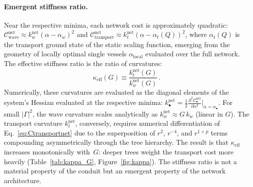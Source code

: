 \documentclass[11pt,a4paper]{article}
\theoremstyle{remark}
\begin{document}
\paragraph{Emergent stiffness ratio.}
Near the respective minima, each network cost is approximately quadratic:
$\mathcal{C}_\mathrm{wave}^\mathrm{net} \approx k_w^\mathrm{net}(\alpha -
\alpha_w)^2$ and
$\mathcal{C}_\mathrm{transport}^\mathrm{net} \approx k_t^\mathrm{net}(\alpha -
\alpha_t(Q))^2$, where $\alpha_t(Q)$ is the transport ground state of the static
scaling function, emerging from the geometry of locally optimal single vessels
$\alpha_\mathrm{local}$ evaluated over the full network. The effective stiffness
ratio is the ratio of curvatures:
\begin{equation}
  \kappa_\mathrm{eff}(G) \equiv \frac{k_t^\mathrm{net}(G)}{k_w^\mathrm{net}(G)}\,.
  \label{eq:kappa_eff}
\end{equation}
Numerically, these curvatures are evaluated as the diagonal elements of the
system's Hessian evaluated at the respective minima: $k_\bullet^\mathrm{net} =
\frac{1}{2} \frac{\partial^2 \mathcal{C}_\bullet^\mathrm{net}}{\partial
\alpha^2}\big|_{\alpha = \alpha_\bullet}$. For small $|\Gamma|^2$, the wave
curvature scales analytically as $k_w^\mathrm{net} \approx G\,k_w$ (linear in
$G$). The transport curvature $k_t^\mathrm{net}$, conversely, requires numerical
differentiation of Eq.~\eqref{eq:Ctransportnet} due to the superposition of
$r^2$, $r^{-4}$, and $r^{1+p}$ terms compounding asymmetrically through the tree
hierarchy.
The result is that $\kappa_\mathrm{eff}$ increases monotonically with~$G$:
deeper trees weight the transport cost more heavily (Table~\ref{tab:kappa_G},
Figure~\ref{fig:kappa}).
The stiffness ratio is not a material property of the conduit but an emergent
property of the network architecture.
\end{document}

